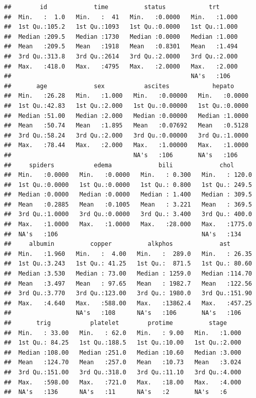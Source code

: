 \documentclass[
]{memoir}
\begin{document}
\begin{verbatim}
##        id             time          status            trt       
##  Min.   :  1.0   Min.   :  41   Min.   :0.0000   Min.   :1.000  
##  1st Qu.:105.2   1st Qu.:1093   1st Qu.:0.0000   1st Qu.:1.000  
##  Median :209.5   Median :1730   Median :0.0000   Median :1.000  
##  Mean   :209.5   Mean   :1918   Mean   :0.8301   Mean   :1.494  
##  3rd Qu.:313.8   3rd Qu.:2614   3rd Qu.:2.0000   3rd Qu.:2.000  
##  Max.   :418.0   Max.   :4795   Max.   :2.0000   Max.   :2.000  
##                                                  NA's   :106    
##       age             sex           ascites            hepato      
##  Min.   :26.28   Min.   :1.000   Min.   :0.00000   Min.   :0.0000  
##  1st Qu.:42.83   1st Qu.:2.000   1st Qu.:0.00000   1st Qu.:0.0000  
##  Median :51.00   Median :2.000   Median :0.00000   Median :1.0000  
##  Mean   :50.74   Mean   :1.895   Mean   :0.07692   Mean   :0.5128  
##  3rd Qu.:58.24   3rd Qu.:2.000   3rd Qu.:0.00000   3rd Qu.:1.0000  
##  Max.   :78.44   Max.   :2.000   Max.   :1.00000   Max.   :1.0000  
##                                  NA's   :106       NA's   :106     
##     spiders           edema             bili             chol       
##  Min.   :0.0000   Min.   :0.0000   Min.   : 0.300   Min.   : 120.0  
##  1st Qu.:0.0000   1st Qu.:0.0000   1st Qu.: 0.800   1st Qu.: 249.5  
##  Median :0.0000   Median :0.0000   Median : 1.400   Median : 309.5  
##  Mean   :0.2885   Mean   :0.1005   Mean   : 3.221   Mean   : 369.5  
##  3rd Qu.:1.0000   3rd Qu.:0.0000   3rd Qu.: 3.400   3rd Qu.: 400.0  
##  Max.   :1.0000   Max.   :1.0000   Max.   :28.000   Max.   :1775.0  
##  NA's   :106                                        NA's   :134     
##     albumin          copper          alkphos             ast        
##  Min.   :1.960   Min.   :  4.00   Min.   :  289.0   Min.   : 26.35  
##  1st Qu.:3.243   1st Qu.: 41.25   1st Qu.:  871.5   1st Qu.: 80.60  
##  Median :3.530   Median : 73.00   Median : 1259.0   Median :114.70  
##  Mean   :3.497   Mean   : 97.65   Mean   : 1982.7   Mean   :122.56  
##  3rd Qu.:3.770   3rd Qu.:123.00   3rd Qu.: 1980.0   3rd Qu.:151.90  
##  Max.   :4.640   Max.   :588.00   Max.   :13862.4   Max.   :457.25  
##                  NA's   :108      NA's   :106       NA's   :106     
##       trig           platelet        protime          stage      
##  Min.   : 33.00   Min.   : 62.0   Min.   : 9.00   Min.   :1.000  
##  1st Qu.: 84.25   1st Qu.:188.5   1st Qu.:10.00   1st Qu.:2.000  
##  Median :108.00   Median :251.0   Median :10.60   Median :3.000  
##  Mean   :124.70   Mean   :257.0   Mean   :10.73   Mean   :3.024  
##  3rd Qu.:151.00   3rd Qu.:318.0   3rd Qu.:11.10   3rd Qu.:4.000  
##  Max.   :598.00   Max.   :721.0   Max.   :18.00   Max.   :4.000  
##  NA's   :136      NA's   :11      NA's   :2       NA's   :6
\end{verbatim}
\end{document}
